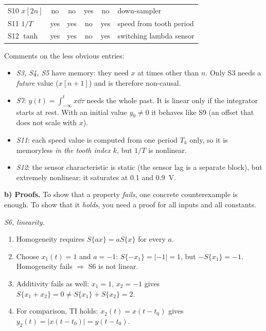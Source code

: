 \begin{solution}
\begin{center}
\begin{tabular}{@{}lccccl@{}}
S10 $x[2n]$      & no  & no  & yes & no  & down-sampler \\
S11 $1/T$        & yes & yes & no  & yes & speed from tooth period \\
S12 $\tanh$      & yes & yes & no  & yes & switching lambda sensor \\
\bottomrule
\end{tabular}
\end{center}
Comments on the less obvious entries:
\begin{itemize}[itemsep=1pt]
  \item \emph{S3, S4, S5} have memory: they need $x$ at times other than $n$.
    Only S3 needs a \emph{future} value ($x[n+1]$) and is therefore non-causal.
  \item \emph{S7}: $y(t)=\int_{-\infty}^t x\dd\tau$ needs the whole past. It is
    linear only if the integrator starts at rest. With an initial value
    $y_0\neq0$ it behaves like S9 (an offset that does not scale with $x$).
  \item \emph{S11}: each speed value is computed from one period $T_k$ only, so
    it is memoryless \emph{in the tooth index $k$}, but $1/T$ is nonlinear.
  \item \emph{S12}: the sensor characteristic is static (the sensor lag is a
    separate block), but extremely nonlinear: it saturates at 0.1 and \SI{0.9}{V}.
\end{itemize}

\textbf{b) Proofs.} To show that a property \emph{fails}, one concrete
counterexample is enough. To show that it \emph{holds}, you need a proof for
all inputs and all constants.

\emph{S6, linearity.}
\begin{enumerate}[label=Step \arabic*:,leftmargin=*,itemsep=1pt]
  \item Homogeneity requires $S\{ax\}=aS\{x\}$ for every $a$.
  \item Choose $x_1(t)=1$ and $a=-1$: $S\{-x_1\}=|-1|=1$, but
    $-S\{x_1\}=-1$. Homogeneity fails $\Rightarrow$ S6 is not linear.
  \item Additivity fails as well: $x_1=1$, $x_2=-1$ gives
    $S\{x_1+x_2\}=0\neq S\{x_1\}+S\{x_2\}=2$.
  \item For comparison, TI holds: $x_2(t)=x(t-t_0)$ gives
    $y_2(t)=|x(t-t_0)|=y(t-t_0)$.
\end{enumerate}


\end{solution}
